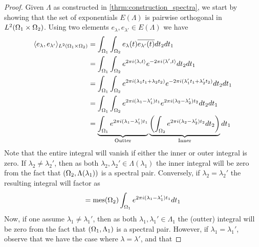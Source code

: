 \documentclass[../thesis.tex]{subfiles}
\begin{document}
\begin{proof}
    Given $\Lambda$ as constructed in \cref{thrm:construction_spectra}, we start by showing that the set of exponentials $E(\Lambda)$
    is pairwise orthogonal in $L^2(\Omega_1 \times \Omega_2)$. Using two elements $e_\lambda,e_{\lambda'} \in E(\Lambda)$ we have %
    \begin{align*}
        \langle e_\lambda,e_{\lambda'}\rangle_{L^2(\Omega_1 \times \Omega_2)} 
        &= \int_{\Omega_1} \int_{\Omega_2} e_{\lambda}(t) \overline{e_{\lambda'}(t)} dt_2 dt_1\\ 
        &= \int_{\Omega_1} \int_{\Omega_2} e^{2\pi i \langle\lambda, t\rangle } e^{-2\pi i  \langle\lambda', t\rangle} dt_2 dt_1\\ 
        &= \int_{\Omega_1} \int_{\Omega_2} e^{2\pi i (\lambda_1 t_1+\lambda_2 t_2)} e^{-2\pi i(\lambda_1' t_1+\lambda_2' t_2)} dt_2 dt_1\\ 
        &= \int_{\Omega_1} \int_{\Omega_2} e^{2\pi i (\lambda_1- \lambda_1')t_1} e^{2\pi i (\lambda_2 - \lambda_2')t_2} dt_2 dt_1\\ 
        &= \underbrace{\int_{\Omega_1} e^{2\pi i  (\lambda_1- \lambda_1')t_1}}_{\text{Outter}} \underbrace{\left(\int_{\Omega_2}  e^{2\pi i (\lambda_2 - \lambda_2')t_2} dt_2\right)}_{\text{Inner}} dt_1
    \end{align*}
    Note that the entire integral will vanish if either the inner or outer integral is zero. If $\lambda_2 \neq \lambda_2'$, then as both $\lambda_2, \lambda_2' \in \Lambda(\lambda_1)$ the inner integral will be zero from the fact that $(\Omega_2, \Lambda(\lambda_1))$ is a spectral pair. Conversely, if $\lambda_2 = \lambda_2'$ the resulting integral will factor as %
    \begin{align*}
        = \operatorname{mes}(\Omega_2) \int_{\Omega_1} e^{2\pi i  (\lambda_1- \lambda_1')t_1} dt_1
    \end{align*}
    Now, if one assume $\lambda_1 \neq \lambda_1'$, then as both $\lambda_1, \lambda_1' \in \Lambda_1$ the (outter) integral will be zero from the fact that $(\Omega_1, \Lambda_1)$ is a spectral pair. However, if $\lambda_1 = \lambda_1'$, observe that we have the case where $\lambda = \lambda'$, and that

\end{proof}
\end{document}
